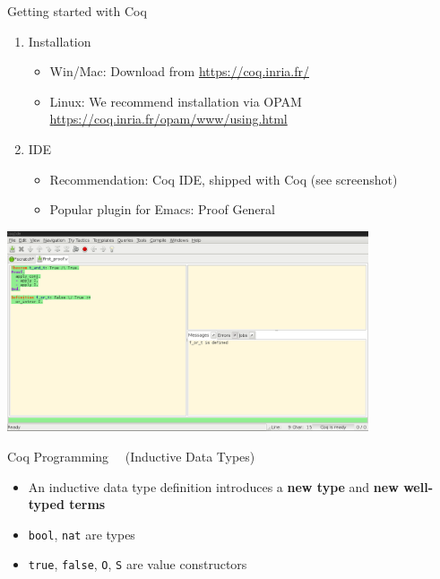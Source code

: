 \begin{frame}{Getting started with Coq}
\begin{enumerate}
  \item Installation
    \begin{itemize}
      \item Win/Mac: Download from \url{https://coq.inria.fr/}
      \item Linux: We recommend installation via OPAM \url{https://coq.inria.fr/opam/www/using.html}
    \end{itemize}
  \item IDE
    \begin{itemize}
      \item Recommendation: Coq IDE, shipped with Coq (see screenshot)
      \item Popular plugin for Emacs: Proof General
    \end{itemize}
\end{enumerate}
\begin{center}
  \includegraphics[width=0.8\textwidth]{content/theorem-proving/images/coqide.png}
\end{center}
\end{frame}

\begin{frame}[fragile]{Coq Programming\small~~ (Inductive Data Types)}
\begin{itemize}
  \item An inductive data type definition introduces a \textbf{new type} and \textbf{new well-typed terms}


\pause

\item \lstinline|bool|, \lstinline|nat| are types
\item \lstinline|true|, \lstinline|false|, \lstinline|O|, \lstinline|S| are value constructors
\end{itemize}
\end{frame}


